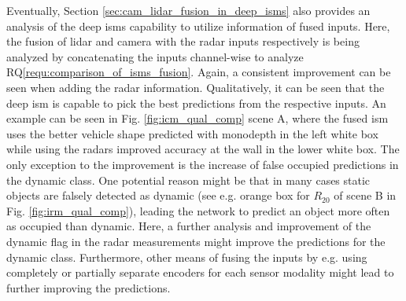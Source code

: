 Eventually, Section \ref{sec:cam_lidar_fusion_in_deep_isms} also provides an analysis of the deep \gls{ism}s capability to utilize information of fused inputs. Here, the fusion of lidar and camera with the radar inputs respectively is being analyzed by concatenating the inputs channel-wise to analyze RQ\ref{requ:comparison_of_isms_fusion}. Again, a consistent improvement can be seen when adding the radar information. Qualitatively, it can be seen that the deep \gls{ism} is capable to pick the best predictions from the respective inputs. An example can be seen in Fig. \ref{fig:icm_qual_comp} scene A, where the fused \gls{ism} uses the better vehicle shape predicted with \gls{monodepth} in the left white box while using the radars improved accuracy at the wall in the lower white box. The only exception to the improvement is the increase of false occupied predictions in the dynamic class. One potential reason might be that in many cases static objects are falsely detected as dynamic (see e.g. orange box for $R_{20}$ of scene B in Fig. \ref{fig:irm_qual_comp}), leading the network to predict an object more often as occupied than dynamic. Here, a further analysis and improvement of the dynamic flag in the radar measurements might improve the predictions for the dynamic class. Furthermore, other means of fusing the inputs by e.g. using completely or partially separate encoders for each sensor modality might lead to further improving the predictions.
%
